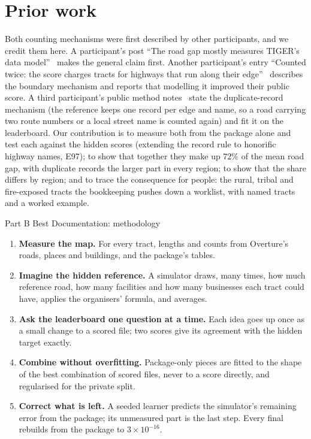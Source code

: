 \documentclass[10pt,twocolumn,a4paper]{article}
\newcommand{\partbanner}[2]{%
  \par\Needspace{14\baselineskip}\vspace{6pt}\noindent
  \colorbox{#1}{\parbox{\dimexpr\columnwidth-2\fboxsep}{\color{white}\bfseries\strut #2}}\par\nopagebreak\vspace{2pt}}
\begin{document}
\section{Prior work}
\label{sec:prior}
Both counting mechanisms were first described by other participants, and we credit them here. A participant's post
``The road gap mostly measures TIGER's data model''~\cite{pio} makes the general claim first. Another participant's entry
``Counted twice: the score charges tracts for highways that run along their edge''~\cite{hhy} describes the boundary
mechanism and reports that modelling it improved their public score. A third participant's public method
notes~\cite{dante} state the duplicate-record
mechanism (the reference keeps one record per edge and name, so a road carrying two route numbers or a local street name
is counted again) and fit it on the leaderboard. Our contribution is to measure both from the package alone and test each
against the hidden scores (extending the record rule to honorific highway names, E97); to show that together they make up
72\% of the mean road gap, with duplicate records the larger part in every region; to show that the share differs by
region; and to trace the consequence for people: the rural, tribal and fire-exposed tracts the bookkeeping pushes down a
worklist, with named tracts and a worked example.

\partbanner{once}{Part B \quad Best Documentation: methodology}
\begin{tcolorbox}[enhanced,colback=white,colframe=once!60,boxrule=0.4pt,arc=1mm,left=1.5mm,right=1.5mm,top=0.8mm,bottom=0.8mm,
  title={\footnotesize\bfseries The method in five plain steps},coltitle=white,colbacktitle=once!85,toptitle=0.2mm,bottomtitle=0.2mm]
\footnotesize
\begin{enumerate}[leftmargin=1.2em,itemsep=1pt]
\item \textbf{Measure the map.} For every tract, lengths and counts from Overture's roads, places and buildings, and the
package's tables.
\item \textbf{Imagine the hidden reference.} A simulator draws, many times, how much reference road, how many facilities
and how many businesses each tract could have, applies the organisers' formula, and averages.
\item \textbf{Ask the leaderboard one question at a time.} Each idea goes up once as a small change to a scored file; two
scores give its agreement with the hidden target exactly.
\item \textbf{Combine without overfitting.} Package-only pieces are fitted to the shape of the best combination of scored
files, never to a score directly, and regularised for the private split.
\item \textbf{Correct what is left.} A seeded learner predicts the simulator's remaining error from the package; its
unmeasured part is the last step. Every final rebuilds from the package to $3\times10^{-16}$.
\end{enumerate}
\end{tcolorbox}
\end{document}
